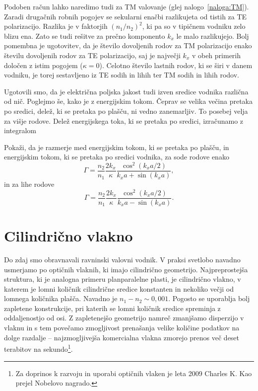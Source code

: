 Podoben račun lahko naredimo tudi za TM valovanje (glej nalogo~\ref{naloga:TM}). Zaradi drugačnih
robnih pogojev se sekularni enačbi razlikujeta od tistih za TE polarizacijo. Razlika je v
faktorjih $(n_1/n_2)^2$, ki pa so v tipičnem vodniku zelo blizu ena. Zato se tudi rešitve 
za prečno komponento $k_x$ le malo razlikujejo. Bolj pomembna je ugotovitev, da je število
dovoljenih rodov za TM polarizacijo enako številu dovoljenih rodov za TE polarizacijo, 
saj je največji $k_x$ v obeh primerih določen z istim pogojem 
($\kappa = 0$). Celotno število lastnih rodov, ki se širi v danem vodniku, je torej sestavljeno 
iz TE sodih in lihih ter TM sodih in lihih rodov.

Ugotovili smo, da je električna poljska jakost tudi izven sredice vodnika različna od nič. 
Poglejmo še, kako je z energijskim tokom. Čeprav se velika večina pretaka po sredici, 
delež, ki se pretaka po plašču, ni vedno zanemarljiv. To posebej velja za višje rodove. 
Delež energijskega toka, ki se pretaka po sredici, izračunamo
z integralom
\begin{definition}
Pokaži, da je razmerje med energijskim tokom, ki se pretaka po plašču, in energijskim tokom, 
ki se pretaka po sredici vodnika, za sode rodove enako
\begin{equation}
\Gamma = \frac{n_2}{n_1}\frac{2 k_x}{\kappa} \frac{\cos^2(k_x a/2)}{k_xa + \sin(k_xa)},
\end{equation}
in za lihe rodove
\begin{equation}
\Gamma = \frac{n_2}{n_1}\frac{2 k_x}{\kappa} \frac{\cos^2(k_x a/2)}{k_xa - \sin(k_xa)}.
\end{equation}
\end{definition}

\section{Cilindrično vlakno}
\label{chap:Cilinder}
Do zdaj smo obravnavali ravninski valovni vodnik. V praksi svetlobo
navadno usmerjamo po optičnih vlaknih, ki imajo cilindrično geometrijo.
Najpreprostejša struktura, ki je analogna primeru planparalelne
plasti, je cilindrično vlakno, v katerem je lomni količnik cilindrične
sredice konstanten in nekoliko večji od lomnega količnika plašča. Navadno je 
$n_1 - n_2 \sim 0,001$. Pogosto se uporablja
bolj zapletene konstrukcije, pri katerih se lomni količnik sredice spreminja z
oddaljenostjo od osi. Z zapletenejšo geometrijo namreč zmanjšamo disperzijo v vlaknu in s tem
povečamo zmogljivost prenašanja velike količine podatkov na dolge razdalje -- 
najzmogljivejša komercialna vlakna zmorejo prenos več deset terabitov na 
sekundo\footnote{Za doprinos k razvoju in uporabi optičnih vlaken je leta 2009 Charles
K. Kao prejel Nobelovo nagrado.}.

